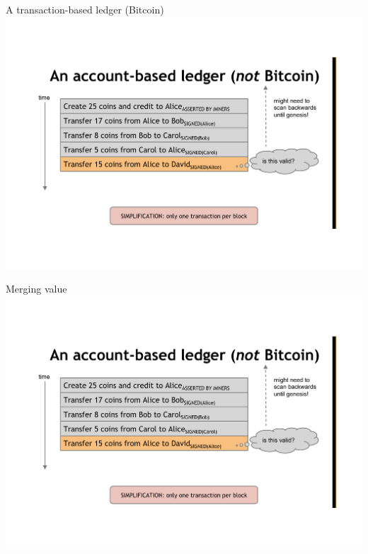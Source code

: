 \begin{frame}{A transaction-based ledger (Bitcoin)}
\includegraphics[width=\textwidth,page=2]{ledger}
\end{frame}

\begin{frame}{Merging value}
\includegraphics[width=\textwidth,page=3]{ledger}
\end{frame}


